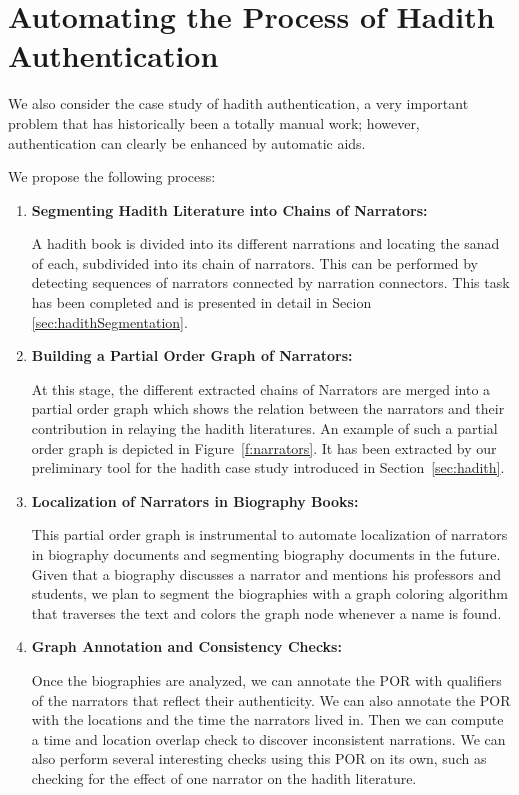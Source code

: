 \documentclass[a4,12pt]{report}
\begin{document}
\section{Automating the Process of Hadith Authentication}

We also consider the case study of hadith authentication, a very important problem
that has historically been a totally manual work; however, authentication can clearly be 
enhanced by automatic aids.

We propose the following process:
\begin{enumerate}
\item \textbf{Segmenting Hadith Literature into Chains of Narrators:}

	A hadith book is divided into its different narrations and locating the sanad of each,
	subdivided into its chain of narrators. This can be performed by detecting sequences of narrators
	connected by narration connectors. This task has been completed and is presented in detail in Secion~
	\ref{sec:hadithSegmentation}.
	
\item \textbf{Building a Partial Order Graph of Narrators:}

	At this stage, the different extracted chains of Narrators are merged into a 
	partial order graph which shows the relation
	between the narrators and their contribution in relaying the hadith literatures. An example of such a 
	partial order graph
	is depicted in Figure~\ref{f:narrators}. 
	It has been extracted by our preliminary tool for the hadith case study introduced in Section~\ref{sec:hadith}.
	
\item \textbf{Localization of Narrators in Biography Books:}

	This partial order graph is instrumental to automate
	localization of narrators in biography documents and
	segmenting biography documents in the future.
	Given that a biography discusses a narrator 
	and mentions his professors and students,
	we plan to segment the biographies with a graph 
	coloring algorithm
	that traverses the text and colors the graph node whenever
	a name is found. 
	
\item \textbf{Graph Annotation and Consistency Checks:}

	Once the biographies are analyzed, we can annotate
	the POR with qualifiers of the narrators that reflect
	their authenticity. 
	We can also annotate the POR with the locations and 
	the time the narrators lived in. 
	Then we can compute a time and location overlap
	check to discover inconsistent narrations.
	We can also perform several interesting checks using 
	this POR on its own, such as checking for the effect of
	one narrator on the hadith literature.
\end{enumerate}
\end{document}
